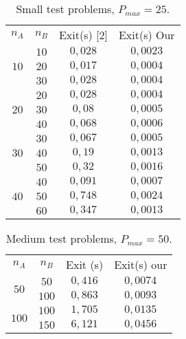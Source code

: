 \documentclass[opre,nonblindrev]{informs3} %
\begin{document}
\begin{table}[h]\scriptsize
	\begin{center}
		\begin{tabular}{|| c | c|| c||c ||}\hline
			
			 \multirow{3}{*}{$n_A$} & \multirow{3}{*}{$n_B$} & \multirow{3}{*}{Exit(s) [2]} & \multirow{3}{*}{Exit(s) Our}\\
			  &&  & \\
			    &    &  &\\\hline
		 \multirow{3}{*}{$10$}   & $10$   &$0,028$  & $0,0023$
			\\
		 & $20$	 & $0,017$
			&$0,0004$
			\\ 
		  & $30$	 & $0,028$
			&$0,0004$
			\\ \hline
			
		\multirow{3}{*}{$20$}   & $20$   & $0,028$
			& $0,0004
			$
			\\
		  & $30$	 &$0,08$
			&$0,0005
			$
			\\ 
		 & $40$	 &$0,068$ &$0,0006
			$\\ \hline
			
			 \multirow{3}{*}{$30$}   & $30$   &  $0,067$
			& $0,0005
			$
			\\
			  & $40$	 &$0,19$
			&$0,0013$
			\\ 
		  & $50$	 & $0,32$
			&$0,0016$
			\\ \hline
			
		 \multirow{3}{*}{$40$}   & $40$   &  $0,091$
			&$0,0007$
			\\
			  & $50$	 & $0,748$
			&$0,0024$
			\\ 
		 & $60$	 & $0,347$
			&$0,0013$
			\\ \hline 
		\end{tabular}
	\end{center}
	\caption{Small test problems, $P_{max}= 25.$} \label{small}
\end{table}


\begin{table}[h]\scriptsize
	\begin{center}
		\begin{tabular}{|| c | c|| c||c ||}\hline
			
		\multirow{3}{*}{$n_A$} & \multirow{3}{*}{$n_B$} & \multirow{3}{*}{Exit (s)} & \multirow{3}{*}{Exit(s) our}\\
			 &&  & \\
			   &    &  &\\\hline
		 \multirow{2}{*}{$50$}   & $50$   & $0,416$
			&$ 0,0074 $
			\\
			  & $100$	 &$0,863$
			&$0,0093$
			\\ \hline
			
			 \multirow{2}{*}{$100$}   & $100$   & $1,705$
			&$0,0135$
			\\
		  & $150$	 & $6,121$
			&$0,0456$
			\\ \hline
			
		\end{tabular}
	\end{center}
	\caption{Medium test problems, $P_{max}= 50.$} \label{medium}
\end{table}
\end{document}

